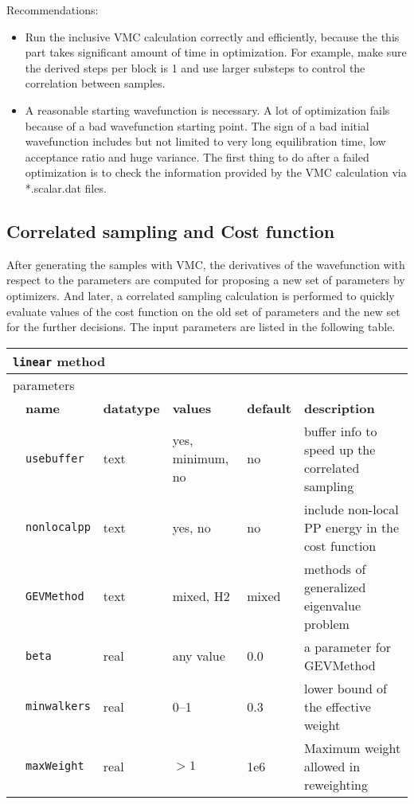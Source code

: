 Recommendations:
\begin{itemize}
\item Run the inclusive VMC calculation correctly and efficiently, because the this part takes significant amount of time in optimization.
For example, make sure the derived steps per block is 1 and use larger substeps to control the correlation between samples.
\item A reasonable starting wavefunction is necessary. A lot of optimization fails because of a bad wavefunction starting point.
The sign of a bad initial wavefunction includes but not limited to very long equilibration time, low acceptance ratio and huge variance.
The first thing to do after a failed optimization is to check the information provided by the VMC calculation via *.scalar.dat files.
\end{itemize}

\subsection{Correlated sampling and Cost function}
After generating the samples with VMC, the derivatives of the wavefunction with respect to the parameters are computed for proposing a new set of parameters by optimizers.
And later, a correlated sampling calculation is performed to quickly evaluate values of the cost function on the old set of parameters and the new set for the further decisions.
The input parameters are listed in the following table.
\begin{table}[h]
\begin{center}
\begin{tabularx}{\textwidth}{l l l l l l }
\hline
\multicolumn{6}{l}{\texttt{linear} method} \\
\hline
\multicolumn{2}{l}{parameters}  & \multicolumn{4}{l}{}\\
   &   \bfseries name     & \bfseries datatype & \bfseries values & \bfseries default   & \bfseries description \\
   &   \texttt{usebuffer} &  text     & yes, minimum, no & no  & buffer info to speed up the correlated sampling\\
   &   \texttt{nonlocalpp} &  text     & yes, no & no  & include non-local PP energy in the cost function\\
   &   \texttt{GEVMethod} &  text     & mixed, H2 & mixed  & methods of generalized eigenvalue problem\\
   &   \texttt{beta} &  real     & any value & 0.0  & a parameter for GEVMethod\\
   &   \texttt{minwalkers} &  real     & 0--1   & 0.3 & lower bound of the effective weight\\
   &   \texttt{maxWeight} &  real     & $>1$   & 1e6 & Maximum weight allowed in reweighting\\
  \hline
\end{tabularx}
\end{center}
\end{table}

